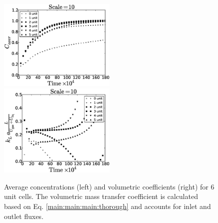 \documentclass[preprint,12pt]{elsarticle}
\begin{document}
\begin{figure}[htb!]
\includegraphics[width=0.5\textwidth]{Figures/aver_units6scale10.eps}\hfill
\includegraphics[width=0.5\textwidth]{Figures/right_def_6scale10.eps}\\
\caption{Average concentrations (left) and volumetric coefficients (right) for $6$ unit cells. The
volumetric
mass transfer coefficient is calculated based on Eq. \ref{main:main:main:thorough} and accounts for inlet
and outlet fluxes. \label{fig:unit:6}}
\end{figure}
\end{document}
